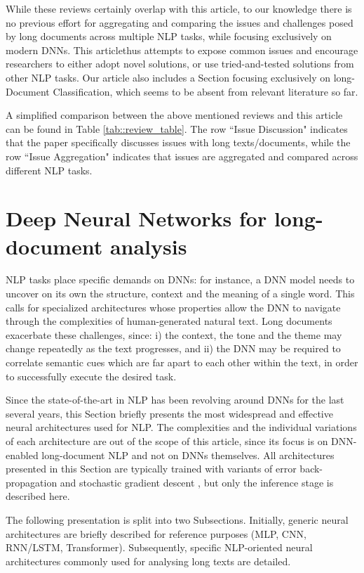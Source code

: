 \documentclass[preprint,review,12pt]{elsarticle}
\begin{document}
While these reviews certainly overlap with this article, to our knowledge there is no previous effort for aggregating and comparing the issues and challenges posed by long documents across multiple NLP tasks, while focusing exclusively on modern DNNs. This articlethus  attempts to expose common issues and encourage researchers to either adopt novel solutions, or use tried-and-tested  solutions from other NLP tasks. Our article also includes a Section focusing exclusively on long-Document Classification, which seems to be absent from relevant literature so far.

A simplified comparison between the above mentioned reviews and this article can be found in Table \ref{tab::review_table}. The row ``Issue Discussion" indicates that the paper specifically discusses issues with long texts/documents, while the row ``Issue Aggregation" indicates that issues are aggregated and compared across different NLP tasks.

    
\section{Deep Neural Networks for long-document analysis}
\label{sec::DNNs}
NLP tasks place specific demands on DNNs: for instance, a DNN model needs to uncover on its own the structure, context and the meaning of a single word. This calls for specialized architectures whose properties allow the DNN to navigate through the complexities of human-generated natural text. Long documents exacerbate these challenges, since: i) the context, the tone and the theme may change repeatedly as the text progresses, and ii) the DNN may be required to correlate semantic cues which are far apart to each other within the text, in order to successfully execute the desired task.

Since the state-of-the-art in NLP has been revolving around DNNs for the last several years, this Section briefly presents the most widespread and effective neural architectures used for NLP. The complexities and the individual variations of each architecture are out of the scope of this article, since its focus is on DNN-enabled long-document NLP and not on DNNs themselves. All architectures presented in this Section are typically trained with variants of error back-propagation and stochastic gradient descent \cite{rumelhart} \cite{jordan}, but only the inference stage is described here.

The following presentation is split into two Subsections. Initially, generic neural architectures are briefly described for reference purposes (MLP, CNN, RNN/LSTM, Transformer). Subsequently, specific NLP-oriented neural architectures commonly used for analysing long texts are detailed.
\end{document}
